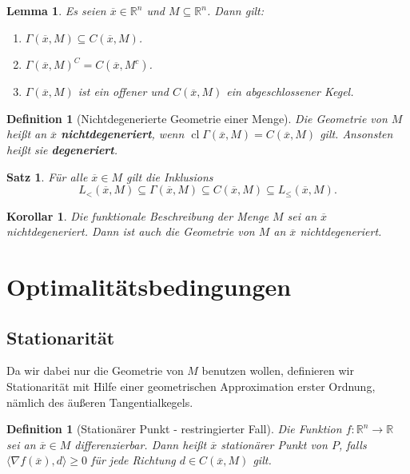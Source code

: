 \documentclass[11pt]{scrreprt}
\newcounter{thm}
\theoremstyle{thmstyle}
\numberwithin{thm}{section}
\newtheorem{definition}[thm]{Definition}
\newtheorem{korollar}[thm]{Korollar}
\newtheorem{lemma}[thm]{Lemma}
\newtheorem{satz}[thm]{Satz}
\begin{document}
\begin{lemma}
	Es seien $\overline{x} \in \mathbb{R}^n$ und $M \subseteq \mathbb{R}^n$. Dann gilt:
	\begin{enumerate}[label=\alph*\upshape)]
		\item $\Gamma(\overline{x}, M) \subseteq C(\overline{x}, M)$.
		\item $\Gamma(\overline{x}, M)^C = C(\overline{x}, M^c)$.
		\item $\Gamma(\overline{x}, M)$ ist ein offener und $C(\overline{x}, M)$ ein abgeschlossener Kegel.
	\end{enumerate}
\end{lemma}

\begin{definition}[Nichtdegenerierte Geometrie einer Menge]
	Die Geometrie von $M$ heißt an $\overline{x}$ \textbf{nichtdegeneriert}, wenn $\operatorname{cl} \Gamma(\overline{x}, M) = C(\overline{x}, M)$ gilt. Ansonsten heißt sie \textbf{degeneriert}.
\end{definition}

\begin{satz}
	Für alle $\overline{x} \in M$ gilt die Inklusions
	$$ L_{<}(\overline{x}, M) \subseteq \Gamma(\overline{x}, M) \subseteq C(\overline{x}, M) \subseteq L_{\leq}(\overline{x}, M). $$
\end{satz}

\begin{korollar}
	Die funktionale Beschreibung der Menge $M$ sei an $\overline{x}$ nichtdegeneriert. Dann ist auch die Geometrie von $M$ an $\overline{x}$ nichtdegeneriert.
\end{korollar}

\section*{Optimalitätsbedingungen}

\subsection*{Stationarität}

\setcounter{section}{2}
\setcounter{thm}{0}

Da wir dabei nur die Geometrie von $M$ benutzen wollen, definieren wir Stationarität mit Hilfe einer geometrischen Approximation erster Ordnung, nämlich des äußeren Tangentialkegels.

\begin{definition}[Stationärer Punkt - restringierter Fall]
	Die Funktion $f \colon \mathbb{R}^n \rightarrow \mathbb{R}$ sei an $\overline{x} \in M$ differenzierbar. Dann heißt $\overline{x}$ stationärer Punkt von $P$, falls $\langle \nabla f(\overline{x}), d \rangle \geq 0$ für jede Richtung $d \in C(\overline{x}, M)$ gilt.
\end{definition}
\end{document}
